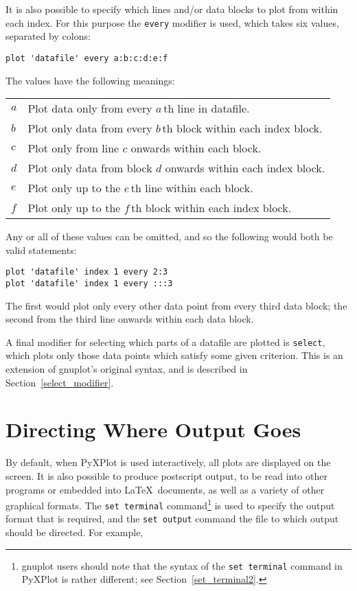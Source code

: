 \documentclass[a4paper,onecolumn,11pt]{book}
\begin{document}
It is also possible to specify which lines and/or data blocks to plot from
within each index. For this purpose the \texttt{every} modifier is used, which
takes six values, separated by colons:

\begin{verbatim}
plot 'datafile' every a:b:c:d:e:f
\end{verbatim}

The values have the following meanings:

\begin{longtable}{p{1.0cm}p{10.5cm}}
$a$ & Plot data only from every $a\,$th line in datafile. \\
$b$ & Plot only data from every $b\,$th block within each index block. \\
$c$ & Plot only from line $c$ onwards within each block. \\
$d$ & Plot only data from block $d$ onwards within each index block. \\
$e$ & Plot only up to the $e\,$th line within each block. \\
$f$ & Plot only up to the $f\,$th block within each index block. \\
\end{longtable}

\noindent Any or all of these values can be omitted, and so the following would
both be valid statements:

\begin{verbatim}
plot 'datafile' index 1 every 2:3
plot 'datafile' index 1 every :::3
\end{verbatim}

\noindent The first would plot only every other data point from every third
data block; the second from the third line onwards within each data block.

A final modifier for selecting which parts of a datafile are plotted is
\texttt{select}, which plots only those data points which satisfy some given
criterion. This is an extension of gnuplot's original syntax, and is described
in Section~\ref{select_modifier}.

\section{Directing Where Output Goes}
\label{directing_output}

By default, when PyXPlot is used interactively, all plots are displayed on the
screen. It is also possible to produce postscript output, to be read into other
programs or embedded into \LaTeX\ documents, as well as a variety of other
graphical formats. The \texttt{set terminal} command\footnote{gnuplot users should note that
the syntax of the \texttt{set terminal} command in PyXPlot is rather different;
see Section~\ref{set_terminal2}.} is used to specify the output format that is
required, and the \texttt{set output} command the file to which output should be
directed. For example,
\end{document}
